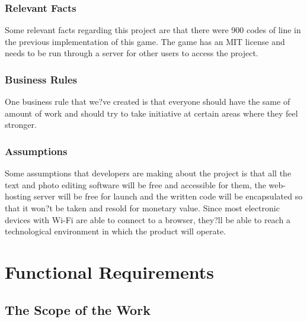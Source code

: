 \documentclass[11pt, oneside]{article}   	%
\begin{document}
\subsubsection*{Relevant Facts}
Some relevant facts regarding this project are that there were 900 codes of line in the previous implementation of this game. The game has an MIT license and needs to be run through a server for other users to access the project.


\subsubsection*{Business Rules}
One business rule that we?ve created is that everyone should have the same of amount of work and should try to take initiative at certain areas where they feel stronger.


\subsubsection*{Assumptions}
Some assumptions that developers are making about the project is that all the text and photo editing software will be free and accessible for them, the web-hosting server will be free for launch and the written code will be encapsulated so that it won?t be taken and resold for monetary value. Since most electronic devices with Wi-Fi are able to connect to a browser, they?ll be able to reach a technological environment in which the product will operate.


\newpage
\section*{Functional Requirements}
\subsection*{The Scope of the Work}
\end{document}
